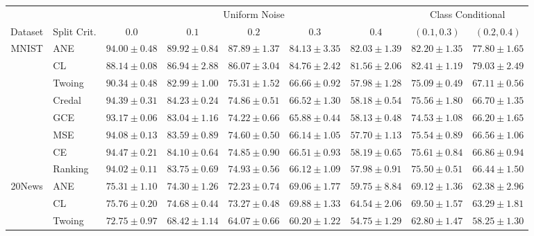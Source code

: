 \documentclass[letterpaper]{article} %
\begin{document}
\begin{table}[t] 
	\scriptsize 
	\centering 
	\begin{tabular}{clccccccc} 
&& \multicolumn{5}{c}{Uniform Noise} & \multicolumn{2}{c}{Class Conditional} \\ \cline{3-9} 
Dataset & Split Crit. & $0.0$ & $0.1$ & $0.2$ & $0.3$ & $0.4$ & $(0.1,0.3)$ & $(0.2,0.4)$  \\ \hline 
\multirow{8}{*}{MNIST}
 & ANE    & $\mathbf{94.00 \pm 0.48}$ & $\mathbf{89.92 \pm 0.84}$ & $\mathbf{87.89 \pm 1.37}$ & $\mathbf{84.13 \pm 3.35}$ & $\mathbf{82.03 \pm 1.39}$ & $\mathbf{82.20 \pm 1.35}$ & $\mathbf{77.80 \pm 1.65}$ \\ 
 & CL     & $88.14 \pm 0.08$ & $86.94 \pm 2.88$ & $\mathbf{86.07 \pm 3.04}$ & $\mathbf{84.76 \pm 2.42}$ & $\mathbf{81.56 \pm 2.06}$ & $\mathbf{82.41 \pm 1.19}$ & $\mathbf{79.03 \pm 2.49}$ \\ 
 & Twoing & $90.34 \pm 0.48$ & $82.99 \pm 1.00$ & $75.31 \pm 1.52$ & $66.66 \pm 0.92$ & $57.98 \pm 1.28$ & $75.09 \pm 0.49$ & $67.11 \pm 0.56$ \\ 
 & Credal & $\mathbf{94.39 \pm 0.31}$ & $84.23 \pm 0.24$ & $74.86 \pm 0.51$ & $66.52 \pm 1.30$ & $58.18 \pm 0.54$ & $75.56 \pm 1.80$ & $66.70 \pm 1.35$ \\ 
 & GCE    & $93.17 \pm 0.06$ & $83.04 \pm 1.16$ & $74.22 \pm 0.66$ & $65.88 \pm 0.44$ & $58.13 \pm 0.48$ & $74.53 \pm 1.08$ & $66.20 \pm 1.65$ \\ 
 & MSE    & $94.08 \pm 0.13$ & $83.59 \pm 0.89$ & $74.60 \pm 0.50$ & $66.14 \pm 1.05$ & $57.70 \pm 1.13$ & $75.54 \pm 0.89$ & $66.56 \pm 1.06$ \\ 
 & CE     & $\mathbf{94.47 \pm 0.21}$ & $84.10 \pm 0.64$ & $74.85 \pm 0.90$ & $66.51 \pm 0.93$ & $58.19 \pm 0.65$ & $75.61 \pm 0.84$ & $66.86 \pm 0.94$ \\ 
 & Ranking & $94.02 \pm 0.11$ & $83.75 \pm 0.69$ & $74.93 \pm 0.56$ & $66.12 \pm 1.09$ & $57.98 \pm 0.91$ & $75.50 \pm 0.51$ & $66.44 \pm 1.50$ \\ 
\hline
\multirow{8}{*}{20News}
 & ANE    & $\mathbf{75.31 \pm 1.10}$ & $\mathbf{74.30 \pm 1.26}$ & $72.23 \pm 0.74$ & $\mathbf{69.06 \pm 1.77}$ & $\mathbf{59.75 \pm 8.84}$ & $\mathbf{69.12 \pm 1.36}$ & $\mathbf{62.38 \pm 2.96}$ \\ 
 & CL     & $\mathbf{75.76 \pm 0.20}$ & $\mathbf{74.68 \pm 0.44}$ & $\mathbf{73.27 \pm 0.48}$ & $\mathbf{69.88 \pm 1.33}$ & $\mathbf{64.54 \pm 2.06}$ & $\mathbf{69.50 \pm 1.57}$ & $\mathbf{63.29 \pm 1.81}$ \\ 
 & Twoing & $72.75 \pm 0.97$ & $68.42 \pm 1.14$ & $64.07 \pm 0.66$ & $60.20 \pm 1.22$ & $54.75 \pm 1.29$ & $62.80 \pm 1.47$ & $58.25 \pm 1.30$ \\ 

\end{tabular}
\end{table}
\end{document}
